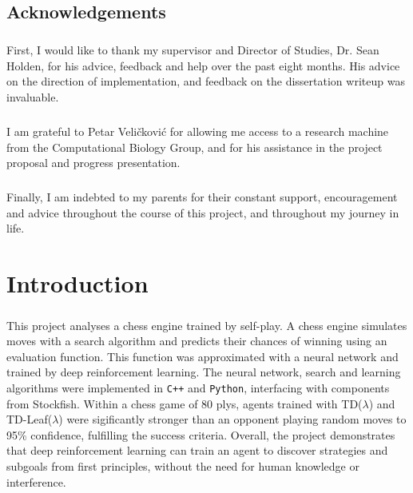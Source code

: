 \documentclass[12pt,a4paper]{book}
\begin{document}

\newpage
\section*{Acknowledgements}

\paragraph{} First, I would like to thank my supervisor and Director of Studies, Dr. Sean Holden, for his advice, feedback and help over the past eight months. His advice on the direction of implementation, and feedback on the dissertation writeup was invaluable.

\paragraph{} I am grateful to Petar Veli\v ckovi\' c for allowing me access to a research machine from the Computational Biology Group, and for his assistance in the project proposal and progress presentation.

\paragraph{} Finally, I am indebted to my parents for their constant support, encouragement and advice throughout the course of this project, and throughout my journey in life.

\cleardoublepage

\setcounter{page}{1}
\pagestyle{headings}






\chapter{Introduction}

\paragraph{} This project analyses a chess engine trained by self-play. A chess engine simulates moves with a search algorithm and predicts their chances of winning using an evaluation function. This function was approximated with a neural network and trained by deep reinforcement learning. The neural network, search and learning algorithms were implemented in \texttt{C++} and \texttt{Python}, interfacing with components from Stockfish. Within a chess game of 80 plys, agents trained with TD($\lambda$) and TD-Leaf($\lambda$) were sigificantly stronger than an opponent playing random moves to 95\% confidence, fulfilling the success criteria. Overall, the project demonstrates that deep reinforcement learning can train an agent to discover strategies and subgoals from first principles, without the need for human knowledge or interference.
\end{document}
